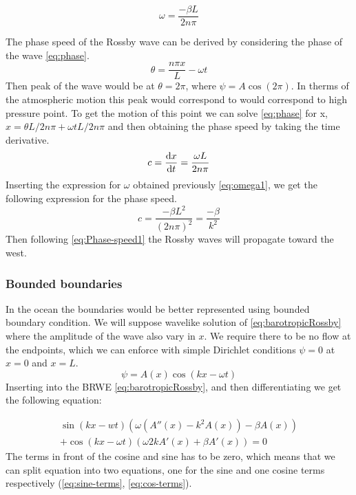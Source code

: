 \begin{equation}\label{eq:omega1}
    \omega = \frac{-\beta L}{2n\pi}
\end{equation}

The phase speed of the Rossby wave can be derived by considering the phase of
the wave \cref{eq:phase}.
\begin{equation}\label{eq:phase}
    \theta = \frac{n \pi x}{L} - \omega t
\end{equation}
Then peak of the wave would be at $\theta = 2\pi$, where $\psi = A\cos{(2\pi)}$.
In therms of the atmospheric motion this peak would correspond to would
correspond to high pressure point. To get the motion of this point we can solve
\cref{eq:phase} for x, $x=\theta L / 2n \pi + \omega t L / 2n \pi$ and then
obtaining the phase speed by taking the time derivative.
\begin{equation}
    c = \dv{x}{t} = \frac{\omega L}{2n\pi}
\end{equation}
Inserting the expression for $\omega$ obtained previously \cref{eq:omega1}, we
get the following expression for the phase speed.
\begin{equation}\label{eq:Phase-speed1}
    c = \frac{-\beta L^2}{(2n\pi)^2} = \frac{-\beta}{k^2}
\end{equation}
Then following \cref{eq:Phase-speed1} the Rossby waves will propagate
toward the west.
\subsubsection{Bounded boundaries}
In the ocean the boundaries would be better represented using bounded boundary
condition. We will suppose wavelike solution of \cref{eq:barotropicRossby}
where the amplitude of the wave also vary in $x$. We
require there to be no flow at the endpoints, which we can enforce with simple
Dirichlet conditions $\psi= 0$ at $x=0$ and $x=L$.
\begin{equation}\label{eq:waveSolution2}
    \psi = A(x)\cos{(kx-\omega t)}
\end{equation}
Inserting \label{eq:waveSolution2} into the BRWE
\cref{eq:barotropicRossby}, and then differentiating we get the following
equation:

\begin{equation}\label{eq:step1}
    \begin{split}
    \sin{(kx-wt)\left(\omega(A''(x)-k^2A(x))- \beta A(x)\right)} \\
    + \cos{(kx - \omega t)}\left(\omega 2kA'(x) +\beta A'(x)\right) = 0
    \end{split}
\end{equation}
The terms in front of the cosine and sine has to be zero, which means that we
can split equation into two equations, one for the sine and one cosine
terms respectively (\cref{eq:sine-terms}, \cref{eq:cos-terms}).


